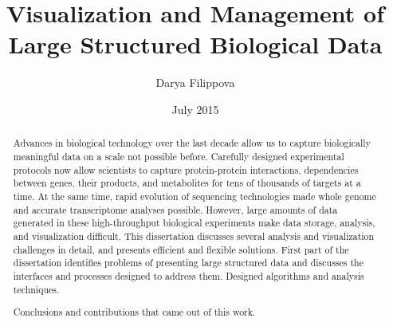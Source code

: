 \documentclass[12pt]{cmuthesis}
\begin{document}
\frontmatter

\pagestyle{empty}

\title{ %
{\bf Visualization and Management of Large Structured Biological Data}}
\author{Darya Filippova}
\date{July 2015}
\trnumber{}


\disclaimer{}



\maketitle


\pagestyle{plain} %


\begin{abstract}

Advances in biological technology over the last decade allow us to capture biologically meaningful data on a scale not possible before. Carefully designed experimental protocols now allow scientists to capture protein-protein interactions, dependencies between genes, their products, and metabolites for tens of thousands of targets at a time. At the same time, rapid evolution of sequencing technologies made whole genome and accurate transcriptome analyses possible. However, large amounts of data generated in these high-throughput biological experiments make data storage, analysis, and visualization difficult.
This dissertation discusses several analysis and visualization challenges in detail, and presents efficient and flexible solutions. %
First part of the dissertation identifies problems of presenting large structured data  and discusses the interfaces and processes designed to address them.
Designed algorithms and analysis techniques.

Conclusions and contributions that came out of this work.

\end{abstract}
\end{document}
